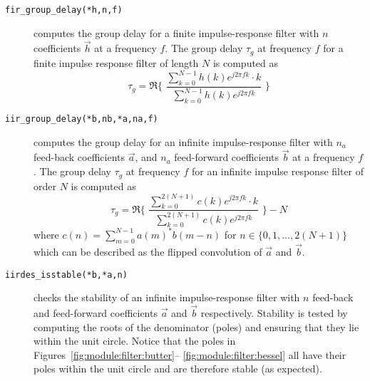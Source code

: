 \begin{description}
\item[{\tt fir\_group\_delay(*h,n,f)}]
    computes the group delay for a finite impulse-response filter with
    $n$ coefficients $\vec{h}$ at a frequency $f$.
    The group delay $\tau_g$ at frequency $f$
    for a finite impulse response filter of length $N$
    is computed as
    \begin{equation}
    \label{eqn:filter:firdes:misc:fir_group_delay}
        \tau_g = \Re\Biggl\{ \,\,
            \frac{
                \sum_{k=0}^{N-1}{h(k)e^{j 2 \pi f k} \cdot k}
            } {
                \sum_{k=0}^{N-1}{h(k)e^{j 2 \pi f k}}
            }\,\,
            \Biggr\}
    \end{equation}

\item[{\tt iir\_group\_delay(*b,nb,*a,na,f)}]
    computes the group delay for an infinite impulse-response filter
    with $n_a$ feed-back coefficients $\vec{a}$,
    and $n_a$ feed-forward coefficients $\vec{b}$
    at a frequency $f$.
    The group delay $\tau_g$ at frequency $f$ for an infinite impulse
    response filter of order $N$ is computed as
    \begin{equation}
    \label{eqn:filter:firdes:misc:iir_group_delay}
        \tau_g = \Re\Biggl\{ \,\,
            \frac{
                \sum_{k=0}^{2(N+1)}{c(k)e^{j 2 \pi f k} \cdot k}
            } {
                \sum_{k=0}^{2(N+1)}{c(k)e^{j 2 \pi f k}}
            }\,\,
            \Biggr\}
            - N
    \end{equation}
    where $c(n) = \sum_{m=0}^{N-1}{a(m)^*b(m-n)}$
    for $n \in \{0,1,\ldots,2(N+1)\}$
    which can be described as the flipped convolution of $\vec{a}$ and
    $\vec{b}$.

\item[{\tt iirdes\_isstable(*b,*a,n)}]
    checks the stability of an infinite impulse-response filter with $n$
    feed-back and feed-forward coefficients $\vec{a}$ and $\vec{b}$
    respectively.
    Stability is tested by computing the roots of the denominator
    (poles) and ensuring that they lie within the unit circle.
    Notice that the poles in
    Figures~\ref{fig:module:filter:butter}--%
           \ref{fig:module:filter:bessel}
    all have their poles within the unit circle and are therefore stable
    (as expected).


\end{description}
